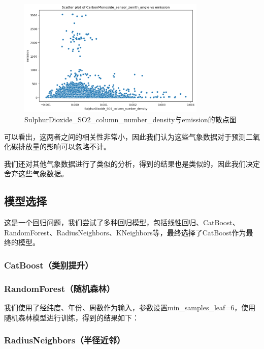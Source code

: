 \documentclass[fontset=windows]{article}
\begin{document}
\begin{figure}[H]
      \centering
      \includegraphics[width=0.8\textwidth]{output1.png}
      \caption{SulphurDioxide\_SO2\_column\_number\_density与emission的散点图}
\end{figure}

可以看出，这两者之间的相关性非常小，因此我们认为这些气象数据对于预测二氧化碳排放量的影响可以忽略不计。

我们还对其他气象数据进行了类似的分析，得到的结果也是类似的，因此我们决定舍弃这些气象数据。

\subsection{模型选择}

这是一个回归问题，我们尝试了多种回归模型，包括线性回归、CatBoost、RandomForest、RadiusNeighbors、KNeighbors等，最终选择了CatBoost作为最终的模型。


\subsubsection{CatBoost（类别提升）}

\subsubsection{RandomForest（随机森林）}

我们使用了经纬度、年份、周数作为输入，参数设置min\_samples\_leaf=6，使用随机森林模型进行训练，得到的结果如下：

\subsubsection{RadiusNeighbors（半径近邻）}
\end{document}
